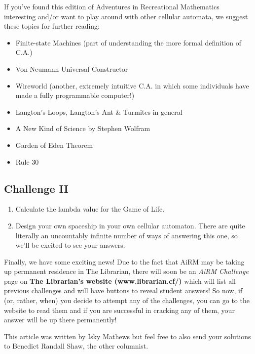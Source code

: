 \documentclass[10pt,a4paper]{article}
\newcounter{count}
\begin{document}
\begin{multicols}{2}
If you've found this edition of Adventures in Recreational Mathematics
interesting and/or want to play around with other cellular automata, we
suggest these topics for further reading:

\begin{itemize}
	\item
	Finite-state Machines (part of understanding the more formal
	definition of C.A.)
	\item
	Von Neumann Universal Constructor
	\item
	Wireworld (another, extremely intuitive C.A. in which some individuals
	have made a fully programmable computer!)
	\item
	Langton's Loops, Langton's Ant \& Turmites in general
	\item
	A New Kind of Science by Stephen Wolfram
	\item
	Garden of Eden Theorem
	\item
	Rule 30
\end{itemize}

\subsection{Challenge II}

\begin{enumerate}
	\item
	Calculate the lambda value for the Game of Life.
	\item
	Design your own spaceship in your own cellular automaton. There are
	quite literally an uncountably infinite number of ways of answering
	this one, so we'll be excited to see your answers.
\end{enumerate}

Finally, we have some exciting news! Due to the fact that AiRM may be
taking up permanent residence in The Librarian, there will soon be an
\emph{AiRM Challenge} page on \textbf{The Librarian's website
	(www.librarian.cf/)} which will list all previous challenges and will
have buttons to reveal student answers! So now, if (or, rather, when)
you decide to attempt any of the challenges, you can go to the website
to read them and if you are successful in cracking any of them, your
answer will be up there permanently!

This article was written by Isky Mathews but feel free to also send your
solutions to Benedict Randall Shaw, the other columnist.

\end{multicols}


\end{document}
